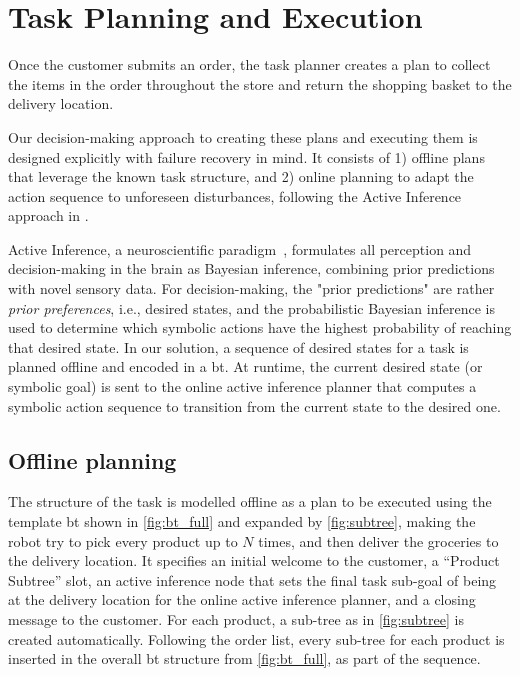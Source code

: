 \section{Task Planning and Execution}
\label{sec:decision_making}

Once the customer submits an order, the task planner creates
a plan to collect the items in the order throughout the store and return the shopping basket to the delivery location.

Our decision-making approach to creating these plans and
executing them is designed explicitly with failure recovery
in mind. It consists of 1) offline plans that leverage the
known task structure, and 2) online planning to
adapt the action sequence to unforeseen disturbances,
following the Active Inference approach in \cite{pezzato2023active}. 

Active Inference, a neuroscientific paradigm~\cite{friston2017active}, formulates all perception and decision-making in the brain as Bayesian inference, combining prior predictions with novel sensory data. For decision-making, the "prior predictions" are rather \textit{prior preferences}, i.e., desired states, and the probabilistic Bayesian inference is used to determine which symbolic actions have the highest probability of reaching that desired state. In our solution, a sequence of desired states for a task is planned offline and encoded in a \ac{bt}. At runtime, the current desired state (or symbolic goal) is sent to the online active inference planner that computes a symbolic action sequence to transition from the current state to the desired one.


\subsection{Offline planning}

The structure of the task is modelled offline as a plan to
be executed using the template \ac{bt} shown in
\cref{fig:bt_full} and expanded by
\cref{fig:subtree}, making the robot try to pick every
product up to $N$ times, and then deliver the groceries to
the delivery location.
It specifies an initial welcome to the customer, a ``Product
Subtree'' slot, an active inference node that sets the final
task sub-goal of being at the delivery location for the
online active inference planner, and a closing message to
the customer.  For each product, a sub-tree as in
\cref{fig:subtree} is created automatically. Following
the order list, every sub-tree for each product is
inserted in the overall \acf{bt} structure from \cref{fig:bt_full}, as part of the sequence.


